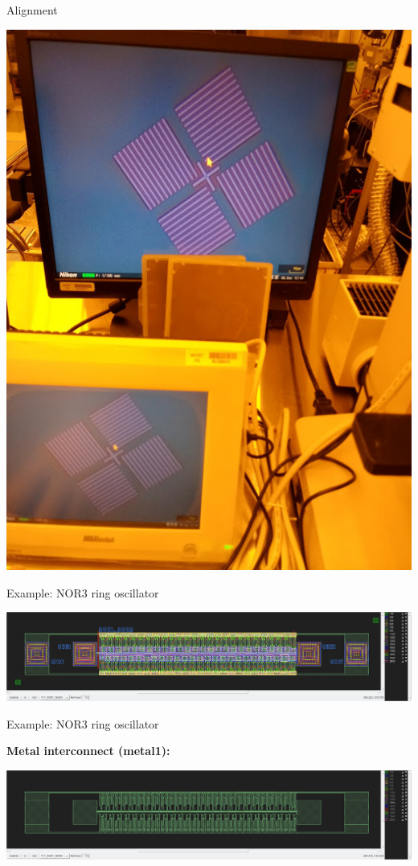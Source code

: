 \documentclass[aspectratio=169]{beamer}
\begin{document}
\begin{frame}{Alignment}
\begin{center}
\includegraphics[height=0.8\textheight]{images/20181211_161801_Burst01.jpg}
\end{center}
\end{frame}

\begin{frame}{Example: NOR3 ring oscillator}
\begin{center}
	\includegraphics[width=\textwidth]{images/Screenshot_20181219_184458.png}
\end{center}
\end{frame}

\begin{frame}{Example: NOR3 ring oscillator}
\begin{center}
	\textbf{Metal interconnect (metal1):}

	\includegraphics[width=\textwidth]{images/Screenshot_20181219_184526.png}
\end{center}
\end{frame}
\end{document}
